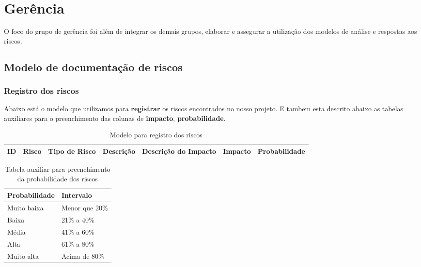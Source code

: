 \section{Gerência}

O foco do grupo de gerência foi além de integrar os demais grupos, elaborar e assegurar a utilização dos modelos de análise e respostas aos riscos.

\subsection{Modelo de documentação de riscos}

\subsubsection{Registro dos riscos}
Abaixo está o modelo que utilizamos para \textbf{registrar} os riscos encontrados no nosso projeto. E tambem esta descrito abaixo as tabelas auxiliares para o preenchimento das colunas de \textbf{impacto}, \textbf{probabilidade}.

\begin{table}[h]
    \centering
    \begin{tabular}{|p{1cm}|p{2cm}|p{2cm}|p{2cm}|p{2cm}|p{1.7cm}|p{2.9cm}|}
    \hline
    \textbf{ID}  & \textbf{Risco} & \textbf{Tipo de Risco} & \textbf{Descrição} & \textbf{Descrição do Impacto} & \textbf{Impacto} & \textbf{Probabilidade} \\ \hline
\end{tabular}
    \caption{Modelo para registro dos riscos}
    \end{table}

    \begin{table}[h]
        \centering
        \begin{tabular}{|p{3cm}|p{3cm}|}
        \hline
        \textbf{Probabilidade}  & \textbf{Intervalo} \\ \hline
        Muito baixa & Menor que 20\% \\ \hline
        Baixa & 21\% a 40\% \\ \hline
        Média & 41\% a 60\% \\ \hline
        Alta & 61\% a 80\%\\ \hline
        Muito alta & Acima de 80\%\\ \hline
    \end{tabular}
        \caption{Tabela auxiliar para preenchimento da probabilidade dos riscos}
        \end{table}

